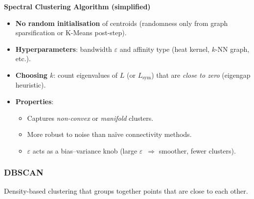 \textbf{Spectral Clustering Algorithm (simplified)}
\noindent
{}

\begin{itemize}
    \item \textbf{No random initialisation} of centroids (randomness only from graph sparsification or K-Means post-step).
    \item \textbf{Hyperparameters}: bandwidth $\varepsilon$ and affinity type
          (heat kernel, $k$-NN graph, etc.).
    \item \textbf{Choosing $k$}: count eigenvalues of $L$ (or $L_{\text{sym}}$)
          that are \emph{close to zero} (eigengap heuristic).
    \item \textbf{Properties}:
          \begin{itemize}
              \item Captures \emph{non-convex} or \emph{manifold} clusters.
              \item More robust to noise than naïve connectivity methods.
              \item $\varepsilon$ acts as a bias–variance knob
                    (large $\varepsilon$~$\Rightarrow$ smoother, fewer clusters).
          \end{itemize}
\end{itemize}


\subsubsection{DBSCAN}
Density-based clustering that groups together points that are close to each other.

